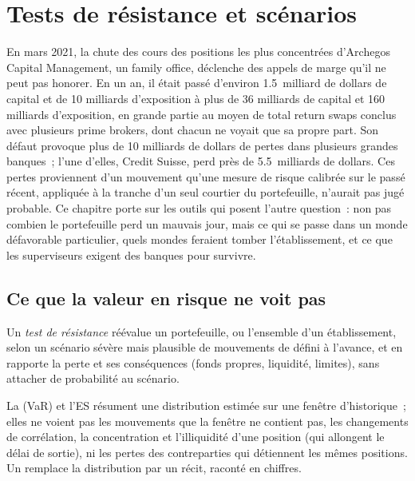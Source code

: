 \chapter{Tests de résistance et scénarios}\label{ch:rc:stress-testing-and-scenarios}

En mars 2021, la chute des cours des positions les plus concentrées d'Archegos Capital
Management, un family office, déclenche des appels de marge qu'il ne peut pas honorer. En un an, il était passé
d'environ 1.5~milliard de dollars de capital et de 10 milliards d'exposition à plus de 36 milliards de
capital et 160 milliards d'exposition, en grande partie au moyen de total return swaps conclus avec plusieurs prime
brokers, dont chacun ne voyait que sa propre part. Son défaut provoque plus de 10 milliards de
dollars de pertes dans plusieurs grandes banques~; l'une d'elles, Credit Suisse, perd près de 5.5~milliards de dollars. Ces pertes proviennent d'un
mouvement qu'une mesure de risque calibrée sur le passé récent, appliquée à la tranche d'un seul courtier
du portefeuille, n'aurait pas jugé probable. Ce chapitre porte sur les outils qui posent l'autre
question~: non pas combien le portefeuille perd un mauvais jour, mais ce qui se passe dans un monde défavorable particulier,
quels mondes feraient tomber l'établissement, et ce que les superviseurs exigent des banques pour survivre.

\section{Ce que la valeur en risque ne voit pas}

\begin{definition}\label{def:rc:stress-testing-and-scenarios:stress}
Un \emph{test de résistance} réévalue un portefeuille, ou l'ensemble d'un établissement, selon un
scénario sévère mais plausible de mouvements de  défini à l'avance, et en rapporte la perte et ses
conséquences (fonds propres, liquidité, limites), sans attacher de probabilité au scénario.
\end{definition}

La  (VaR) et l'ES résument une distribution estimée sur une fenêtre d'historique~; elles ne voient pas les mouvements que la
fenêtre ne contient pas, les changements de corrélation, la concentration et l'illiquidité d'une
position (qui allongent le délai de sortie), ni les pertes des contreparties qui détiennent les mêmes
positions. Un  remplace la distribution par un récit, raconté en chiffres.

